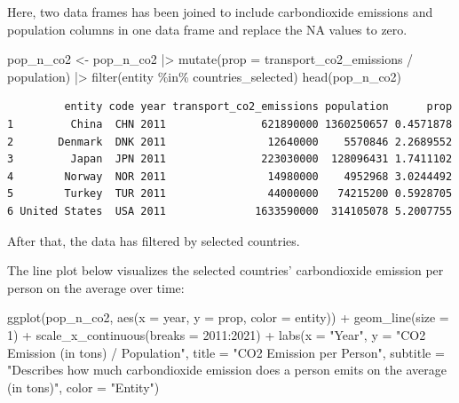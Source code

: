 \documentclass[
  11pt,
  a4paper,
  DIV=11,
  numbers=noendperiod]{scrartcl}
\newenvironment{Shaded}{\begin{snugshade}}{\end{snugshade}}
\newcommand{\AttributeTok}[1]{\textcolor[rgb]{0.40,0.45,0.13}{#1}}
\newcommand{\DecValTok}[1]{\textcolor[rgb]{0.68,0.00,0.00}{#1}}
\newcommand{\FunctionTok}[1]{\textcolor[rgb]{0.28,0.35,0.67}{#1}}
\newcommand{\NormalTok}[1]{\textcolor[rgb]{0.00,0.23,0.31}{#1}}
\newcommand{\OtherTok}[1]{\textcolor[rgb]{0.00,0.23,0.31}{#1}}
\newcommand{\SpecialCharTok}[1]{\textcolor[rgb]{0.37,0.37,0.37}{#1}}
\newcommand{\StringTok}[1]{\textcolor[rgb]{0.13,0.47,0.30}{#1}}
\begin{document}
Here, two data frames has been joined to include carbondioxide emissions
and population columns in one data frame and replace the NA values to
zero.

\begin{Shaded}
\begin{Highlighting}[]
\NormalTok{pop\_n\_co2 }\OtherTok{\textless{}{-}}\NormalTok{ pop\_n\_co2 }\SpecialCharTok{|\textgreater{}}
  \FunctionTok{mutate}\NormalTok{(}\AttributeTok{prop =}\NormalTok{ transport\_co2\_emissions }\SpecialCharTok{/}\NormalTok{ population) }\SpecialCharTok{|\textgreater{}}
  \FunctionTok{filter}\NormalTok{(entity }\SpecialCharTok{\%in\%}\NormalTok{ countries\_selected)}
\FunctionTok{head}\NormalTok{(pop\_n\_co2)}
\end{Highlighting}
\end{Shaded}

\begin{verbatim}
         entity code year transport_co2_emissions population      prop
1         China  CHN 2011               621890000 1360250657 0.4571878
2       Denmark  DNK 2011                12640000    5570846 2.2689552
3         Japan  JPN 2011               223030000  128096431 1.7411102
4        Norway  NOR 2011                14980000    4952968 3.0244492
5        Turkey  TUR 2011                44000000   74215200 0.5928705
6 United States  USA 2011              1633590000  314105078 5.2007755
\end{verbatim}

After that, the data has filtered by selected countries.

The line plot below visualizes the selected countries' carbondioxide
emission per person on the average over time:

\begin{Shaded}
\begin{Highlighting}[]
\FunctionTok{ggplot}\NormalTok{(pop\_n\_co2, }\FunctionTok{aes}\NormalTok{(}\AttributeTok{x =}\NormalTok{ year, }\AttributeTok{y =}\NormalTok{ prop, }\AttributeTok{color =}\NormalTok{ entity)) }\SpecialCharTok{+}
  \FunctionTok{geom\_line}\NormalTok{(}\AttributeTok{size =} \DecValTok{1}\NormalTok{) }\SpecialCharTok{+}
  \FunctionTok{scale\_x\_continuous}\NormalTok{(}\AttributeTok{breaks =} \DecValTok{2011}\SpecialCharTok{:}\DecValTok{2021}\NormalTok{) }\SpecialCharTok{+}
  \FunctionTok{labs}\NormalTok{(}\AttributeTok{x =} \StringTok{"Year"}\NormalTok{,}
       \AttributeTok{y =} \StringTok{"CO2 Emission (in tons) / Population"}\NormalTok{,}
       \AttributeTok{title =} \StringTok{"CO2 Emission per Person"}\NormalTok{,}
       \AttributeTok{subtitle =} \StringTok{"Describes how much carbondioxide emission does a person}
\StringTok{       emits on the average (in tons)"}\NormalTok{,}
       \AttributeTok{color =} \StringTok{"Entity"}\NormalTok{)}
\end{Highlighting}
\end{Shaded}
\end{document}
